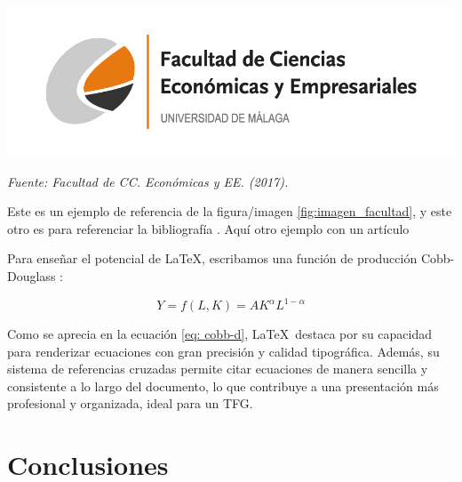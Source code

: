\documentclass[13pt,a4paper]{report}
\begin{document}
\begin{center}
    \centering %
    \includegraphics[width=\linewidth]{logo.png} %
    \label{fig:imagen_facultad} %
    \par %
    \raggedright %
    {\fontsize{12}{14}\selectfont\textit{Fuente: Facultad de CC. Económicas y EE. (2017).}} %
\end{center}

\vspace{12pt}

Este es un ejemplo de referencia de la figura/imagen \ref{fig:imagen_facultad}, y este otro es para referenciar la bibliografía \citep{tfg_sample}. Aquí otro ejemplo con un artículo \citep{baccini2007edgeworth}

\vspace{12pt}

Para enseñar el potencial de \LaTeX, escribamos una función de producción Cobb-Douglass \citep{cobb_theory_1928}: 

\begin{equation}
    Y = f(L,K) = A K^\alpha L^{1-\alpha} \label{eq: cobb-d}
\end{equation}

\vspace{12pt}

Como se aprecia en la ecuación \ref{eq: cobb-d}, \LaTeX\ destaca por su capacidad para renderizar ecuaciones con gran precisión y calidad tipográfica. Además, su sistema de referencias cruzadas permite citar ecuaciones de manera sencilla y consistente a lo largo del documento, lo que contribuye a una presentación más profesional y organizada, ideal para un TFG.
\section{Conclusiones} 

\vspace{12pt}
\end{document}
